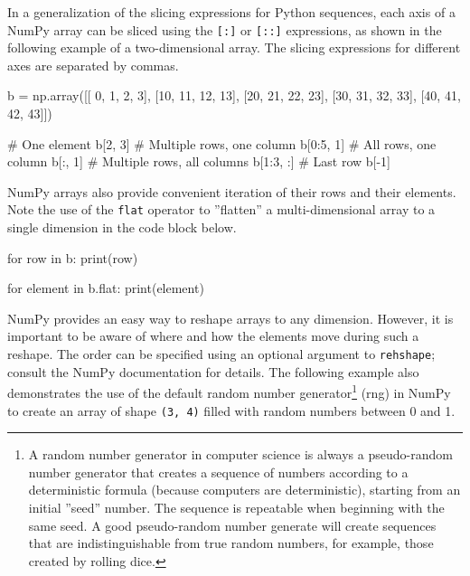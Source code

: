 In a generalization of the slicing expressions for Python sequences, each axis of a NumPy array can be sliced using the \texttt{[:]} or \texttt{[::]} expressions, as shown in the following example of a two-dimensional array. The slicing expressions for different axes are separated by commas.

\begin{pythoncode}
b = np.array([[ 0,  1,  2,  3],
              [10, 11, 12, 13],
              [20, 21, 22, 23],
              [30, 31, 32, 33],
              [40, 41, 42, 43]])
       
# One element              
b[2, 3]
# Multiple rows, one column
b[0:5, 1]
# All rows, one column
b[:, 1]
# Multiple rows, all columns
b[1:3, :]
# Last row
b[-1]
\end{pythoncode}



NumPy arrays also provide convenient iteration of their rows and their elements. Note the use of the \texttt{flat} operator to ''flatten'' a multi-dimensional array to a single dimension in the code block below.

\begin{pythoncode}
for row in b:
    print(row)

for element in b.flat:
    print(element)
\end{pythoncode}

NumPy provides an easy way to reshape arrays to any dimension. However, it is important to be aware of where and how the elements move during such a reshape. The order can be specified using an optional argument to \texttt{rehshape}; consult the NumPy documentation for details. The following example also demonstrates the use of the default random number generator\footnote{A random number generator in computer science is always a pseudo-random number generator that creates a sequence of numbers according to a deterministic formula (because computers are deterministic), starting from an initial ''seed'' number. The sequence is repeatable when beginning with the same seed. A good pseudo-random number generate will create sequences that are indistinguishable from true random numbers, for example, those created by rolling dice.} (rng) in NumPy to create an array of shape \texttt{(3, 4)} filled with random numbers between 0 and 1.

